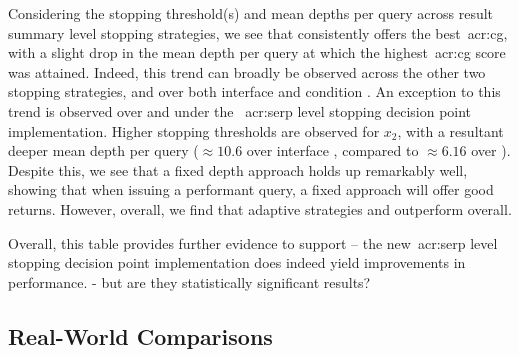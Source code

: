Considering the stopping threshold(s) and mean depths per query across result summary level stopping strategies, we see that  consistently offers the best~\gls{acr:cg}, with a slight drop in the mean depth per query at which the highest~\gls{acr:cg} score was attained. Indeed, this trend can broadly be observed across the other two stopping strategies, and over both interface  and condition . An exception to this trend is observed over  and  under the ~\gls{acr:serp} level stopping decision point implementation. Higher stopping thresholds are observed for $x_2$, with a resultant deeper mean depth per query ($\approx10.6$ over interface , compared to $\approx6.16$ over ). Despite this, we see that a fixed depth approach holds up remarkably well, showing that when issuing a performant query, a fixed approach will offer good returns. However, overall, we find that adaptive strategies  and  outperform  overall.

Overall, this table provides further evidence to support  -- the new~\gls{acr:serp} level stopping decision point implementation does indeed yield improvements in performance.
- but are they statistically significant results?

\subsection{Real-World Comparisons}\label{sec:serp:results:comparisons}

